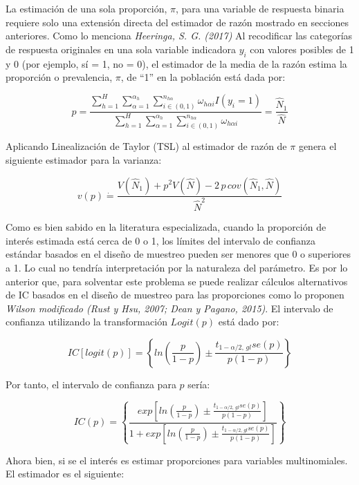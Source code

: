 \documentclass[
  12pt,
]{book}
\begin{document}
La estimación de una sola proporción, \(\pi\), para una variable de respuesta binaria requiere solo una extensión directa del estimador de razón mostrado en secciones anteriores. Como lo menciona \emph{Heeringa, S. G. (2017)} Al recodificar las categorías de respuesta originales en una sola variable indicadora \(y_{i}\) con valores posibles de 1 y 0 (por ejemplo, sí = 1, no = 0), el estimador de la media de la razón estima la proporción o prevalencia, \(\pi\), de ``1'' en la población está dada por:

\[
p =  \frac{{\displaystyle \sum_{h=1}^{H}\sum_{\alpha=1}^{\alpha_{h}}\sum_{i\in\left(0,1\right)}^{n_{h\alpha}}}\omega_{h\alpha i}I\left(y_{i}=1\right)}{{\displaystyle \sum_{h=1}^{H}\sum_{\alpha=1}^{\alpha_{h}}\sum_{i\in\left(0,1\right)}^{n_{h\alpha}}}\omega_{h\alpha i}}
 =  \frac{\hat{N}_{1}}{\hat{N}}
\]

Aplicando Linealización de Taylor (TSL) al estimador de razón de \(\pi\) genera el siguiente estimador para la varianza:

\[
v\left(p\right) \dot{=} \frac{V\left(\hat{N}_{1}\right)+p^{2}V\left(\hat{N}\right)-2\,p\,cov\left(\hat{N}_{1},\hat{N}\right)}{\hat{N}^{2}}
\]

Como es bien sabido en la literatura especializada, cuando la proporción de interés estimada está cerca de 0 o 1, los límites del intervalo de confianza estándar basados en el diseño de muestreo pueden ser menores que 0 o superiores a 1. Lo cual no tendría interpretación por la naturaleza del parámetro. Es por lo anterior que, para solventar este problema se puede realizar cálculos alternativos de IC basados en el diseño de muestreo para las proporciones como lo proponen \emph{Wilson modificado (Rust y Hsu, 2007; Dean y Pagano, 2015)}. El intervalo de confianza utilizando la transformación \(Logit\left(p\right)\)
está dado por:

\[
IC\left[logit\left(p\right)\right]  =  \left\{ ln\left(\frac{p}{1-p}\right)\pm\frac{t_{1-\alpha/2,\,gl}se\left(p\right)}{p\left(1-p\right)}\right\} 
\]

Por tanto, el intervalo de confianza para \(p\) sería:

\[
IC\left(p\right)  =  \left\{ \frac{exp\left[ln\left(\frac{p}{1-p}\right)\pm\frac{t_{1-\alpha/2,\,gl}se\left(p\right)}{p\left(1-p\right)}\right]}{1+exp\left[ln\left(\frac{p}{1-p}\right)\pm\frac{t_{1-\alpha/2,\,gl}se\left(p\right)}{p\left(1-p\right)}\right]}\right\} 
\]

Ahora bien, si se el interés es estimar proporciones para variables multinomiales. El estimador es el siguiente:
\end{document}
